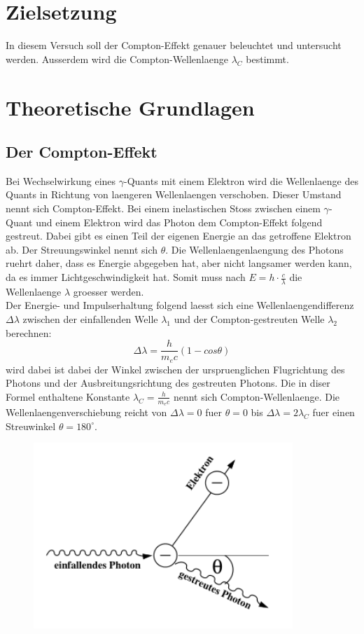 \section{Zielsetzung}
In diesem Versuch soll der Compton-Effekt genauer beleuchtet und untersucht werden. Ausserdem wird die Compton-Wellenlaenge $\lambda_C$ bestimmt.
\section{Theoretische Grundlagen}
\subsection{Der Compton-Effekt}
Bei Wechselwirkung eines $\gamma$-Quants mit einem Elektron wird die Wellenlaenge des Quants in Richtung von laengeren Wellenlaengen verschoben. Dieser Umstand nennt sich Compton-Effekt. Bei einem inelastischen Stoss zwischen einem $\gamma$-Quant und einem Elektron wird das Photon dem Compton-Effekt folgend gestreut. Dabei gibt es einen Teil der eigenen Energie an das getroffene Elektron ab. Der Streuungswinkel nennt sich $\theta$. Die Wellenlaengenlaengung des Photons ruehrt daher, dass es Energie abgegeben hat, aber nicht langsamer werden kann, da es immer Lichtgeschwindigkeit hat. Somit muss nach $E=h\cdot\frac{c}{\lambda}$ die Wellenlaenge $\lambda$ groesser werden.\\
Der Energie- und Impulserhaltung folgend laesst sich eine Wellenlaengendifferenz $\Delta\lambda$ zwischen der einfallenden Welle $\lambda_1$ und der Compton-gestreuten Welle $\lambda_2$ berechnen:
\begin{equation}
    \Delta\lambda=\frac{h}{m_ec}(1-cos\theta)
\end{equation}
\theta wird dabei ist dabei der Winkel zwischen der urspruenglichen Flugrichtung des Photons und der Ausbreitungsrichtung des gestreuten Photons. Die in diser Formel enthaltene Konstante $\lambda_C=\frac{h}{m_ec}$ nennt sich Compton-Wellenlaenge. Die Wellenlaengenverschiebung reicht von $\Delta\lambda=0$ fuer $\theta=0$ bis $\Delta\lambda=2\lambda_C$ fuer einen Streuwinkel $\theta=180^{\circ}$.
\begin{figure}[H]
    \centering
    \captionsetup{justification=centering}
    \includegraphics[height=7cm]{"Schema_Compton.png"}
    \label{Fig:Schema}
\end{figure}
